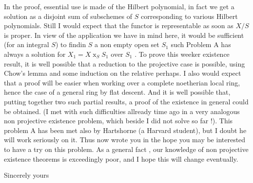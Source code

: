 In the proof, essential use is made of the Hilbert polynomial, in fact we get a solution as a disjoint sum of subschemes of $S$ corresponding to various Hilbert polynomials. Still I would expect that the  functor is representable as soon as $X/S$ is proper. In view of the application we have in mind here, it would be sufficient (for an integral $S$) to findin $S$ a non empty  open set $S_1$ such Problem A has always a solution for $X_1=X\mathbin{x}_S S_1$ over $S_1$ . To prove this weeker existence result, it is well possible that a reduction to the projective case is possible, using Chow's lemma and some induction on the relative  perhaps. I also would expect that a proof will be easier when working over a complete noetherian local ring, hence the case of a general   ring by flat descent. And it is well possible that, putting together two such partial results, a proof of the existence in general could be obtained. (I met with such difficulties allready time ago in a very analogous non projective existence problem, which beside I did not solve so far !). This problem A has been met also by Hartshorne (a Harvard student), but I doubt he will work seriously on it. Thus  now wrote you in the hope you may be interested to have a try on this problem. As a general fact , our knowledge of non projective existence theorems is exceedingly poor, and I hope this will change eventually.

\noindent\hspace*{1cm}Sincerely yours\hfill{}\par
